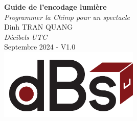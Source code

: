 \documentclass[a4paper,12pt]{report}
\begin{document}
\begin{titlepage}
    \centering
    \vspace*{2cm} %
    
    {\Huge\textbf{Guide de l'encodage lumière}}\\[1.5cm]
    
    {\Large\textit{Programmer la Chimp pour un spectacle}}\\[2cm]
    
    {\Large Dinh TRAN QUANG}\\[0.5cm]
    
    {\large\textit{Décibels UTC}}\\[3cm]
    
    {\large Septembre 2024 - V1.0}\\[3cm]
    
    \includegraphics[width=0.5\textwidth]{Logos/logo_decibels.png}
    
    \vfill %
\end{titlepage}

\renewcommand{\contentsname}{Sommaire} %
\newpage
\tableofcontents
\newpage






\end{document}
